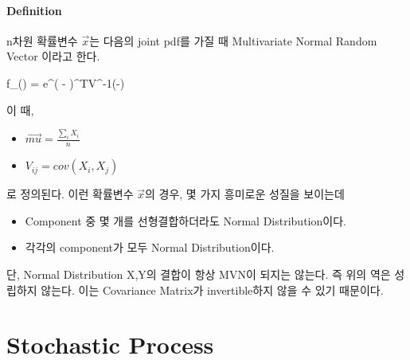 \documentclass[twoside]{article}
\theoremstyle{definition}
\newenvironment{eq}{\equation}{\endequation}
\begin{document}
\paragraph{Definition} n차원 확률변수 $\vec{x}$는 다음의 joint pdf를 가질 때 Multivariate Normal Random Vector 이라고 한다. 

\begin{eq} 
f_{}() =  e^{( - )^TV^{-1}(-)}  
\end{eq}

이 때, 

\begin{itemize} 
\item $\vec{mu} = \frac{\sum_i X_i}{n} $
\item $V_{ij} = cov(X_i, X_j)$ 
\end{itemize}

로 정의된다. 이런 확률변수 $\vec{x}$의 경우, 몇 가지 흥미로운 성질을 보이는데 

\begin{itemize} 
\item Component 중 몇 개를 선형결합하더라도 Normal Distribution이다. 
\item 각각의 component가 모두 Normal Distribution이다. 
\end{itemize}

단, Normal Distribution X,Y의 결합이 항상 MVN이 되지는 않는다. 즉 위의 역은 성립하지 않는다. 이는 Covariance Matrix가 invertible하지 않을 수 있기 때문이다. 



\newpage
\section{Stochastic Process} 



\end{document}
